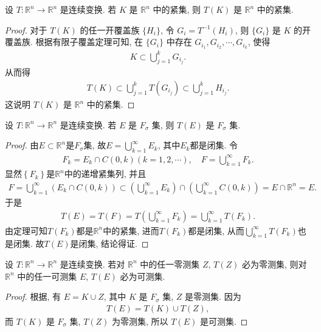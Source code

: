\documentclass[../../main.tex]{subfiles}%
\begin{document}
\begin{theorem}
设 $T:\mathbb{R}^n\to\mathbb{R}^n$ 是连续变换. 若 $K$ 是 $\mathbb{R}^n$ 中的紧集, 则 $T(K)$ 是 $\mathbb{R}^n$ 中的紧集.
\end{theorem}
\begin{proof}

对于 $T(K)$ 的任一开覆盖族 $\{H_i\}$, 令 $G_i = T^{-1}(H_i)$, 则 $\{G_i\}$ 是 $K$ 的开覆盖族. 根据有限子覆盖定理可知, 在 $\{G_i\}$ 中存在 $G_{i_1},G_{i_2},\cdots,G_{i_k}$, 使得
\begin{align*}
K\subset\bigcup_{j = 1}^{k}G_{i_j}.
\end{align*}
从而得
\begin{align*}
T(K)\subset\bigcup_{j = 1}^{k}T(G_{i_j})\subset\bigcup_{j = 1}^{k}H_{i_j}.
\end{align*}
这说明 $T(K)$ 是 $\mathbb{R}^n$ 中的紧集.

\end{proof}

\begin{corollary}
设 $T:\mathbb{R}^n\to\mathbb{R}^n$ 是连续变换. 若 $E$ 是 $F_\sigma$ 集, 则 $T(E)$ 是 $F_\sigma$ 集.
\end{corollary}
\begin{proof}

由$E\subset \mathbb{R} ^n$是$F_{\sigma}$集, 故$E=\bigcup_{k=1}^{\infty}{E_k}$, 其中$E_k$都是闭集. 令
\begin{align*}
F_k=E_k\cap C\left( 0,k \right) \left( k=1,2,\cdots \right) ,\quad F=\bigcup_{k=1}^{\infty}{F_k}.
\end{align*}
显然$\left\{ F_k \right\}$是$\mathbb{R} ^n$中的递增紧集列, 并且
\begin{align*}
F=\bigcup_{k=1}^{\infty}{\left( E_k\cap C\left( 0,k \right) \right)}\subset \left( \bigcup_{k=1}^{\infty}{E_k} \right) \cap \left( \bigcup_{k=1}^{\infty}{C\left( 0,k \right)} \right) =E\cap \mathbb{R} ^n=E.
\end{align*}
于是
\begin{align*}
T\left( E \right) =T\left( F \right) =T\left( \bigcup_{k=1}^{\infty}{F_k} \right) =\bigcup_{k=1}^{\infty}{T\left( F_k \right)}.
\end{align*}
由定理可知$T\left( F_k \right)$都是$\mathbb{R} ^n$中的紧集, 进而$T\left( F_k \right)$都是闭集, 从而$\bigcup_{k=1}^{\infty}{T\left( F_k \right)}$也是闭集. 故$T\left( E \right)$是闭集, 结论得证.

\end{proof}

\begin{corollary}
设 $T:\mathbb{R}^n\to\mathbb{R}^n$ 是连续变换. 若对 $\mathbb{R}^n$ 中的任一零测集 $Z$, $T(Z)$ 必为零测集, 则对 $\mathbb{R}^n$ 中的任一可测集 $E$, $T(E)$ 必为可测集.
\end{corollary}
\begin{proof}

根据, 有 $E = K\cup Z$, 其中 $K$ 是 $F_\sigma$ 集, $Z$ 是零测集. 因为
\begin{align*}
T(E) = T(K)\cup T(Z),
\end{align*}
而 $T(K)$ 是 $F_\sigma$ 集, $T(Z)$ 为零测集, 所以 $T(E)$ 是可测集.

\end{proof}
\end{document}
